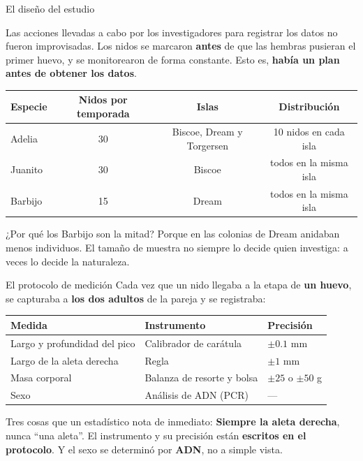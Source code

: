 \documentclass[aspectratio=169,10pt]{beamer}
\newcommand{\destaca}[1]{%
  \par\vspace{3pt}\noindent
  \colorbox{azulClaro}{%
    \parbox{\dimexpr\linewidth-2\fboxsep\relax}{\vspace{3pt}#1\vspace{3pt}}}%
  \par\vspace{3pt}}
\begin{document}
\begin{frame}{El diseño del estudio}
  \destaca{Las acciones llevadas a cabo por los investigadores para registrar los datos no fueron improvisadas. Los nidos se marcaron \textbf{antes} de que las hembras pusieran el primer huevo, y se monitorearon de forma constante. Esto es, \textbf{había un plan antes de obtener los datos}.}
  \vspace{0.4cm}
  \centering
  {\small
  \begin{tabular}{@{}lccc@{}}
    \toprule
    \textbf{Especie} & \textbf{Nidos por temporada} & \textbf{Islas} & \textbf{Distribución} \\
    \midrule
    Adelia  & 30 & Biscoe, Dream y Torgersen & 10 nidos en cada isla \\
    Juanito & 30 & Biscoe & todos en la misma isla \\
    Barbijo & 15 & Dream & todos en la misma isla \\
    \bottomrule
  \end{tabular}}

  \vspace{0.5cm}
  \raggedright
  {\footnotesize ¿Por qué los Barbijo son la mitad? Porque en las colonias de Dream
  anidaban menos individuos. El tamaño de muestra no siempre lo decide quien investiga:
  a veces lo decide la naturaleza.}
\end{frame}
\begin{frame}{El protocolo de medición}
  Cada vez que un nido llegaba a la etapa de \textbf{un huevo}, se capturaba a
  \textbf{los dos adultos} de la pareja y se registraba:
    \vspace{0.35cm}

    \centering
    {\small
  \begin{tabular}{@{}lll@{}}
    \toprule
    \textbf{Medida} & \textbf{Instrumento} & \textbf{Precisión} \\
    \midrule
    Largo y profundidad del pico & Calibrador de carátula & $\pm 0.1$ mm \\
    Largo de la aleta derecha & Regla & $\pm 1$ mm \\
    Masa corporal & Balanza de resorte y bolsa & $\pm 25$ o $\pm 50$ g \\
    Sexo & Análisis de ADN (PCR) & --- \\
    \bottomrule
  \end{tabular}}

  \vspace{0.5cm}
  \raggedright
  \destaca{Tres cosas que un estadístico nota de inmediato:
  \vspace{0.2cm}
  \textbf{Siempre la aleta derecha}, nunca ``una aleta''. El instrumento y su precisión
  están \textbf{escritos en el protocolo}. Y el sexo se determinó por \textbf{ADN}, no
  a simple vista.}
\end{frame}
\end{document}
